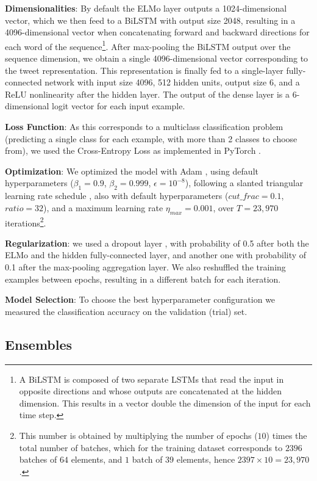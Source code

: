 \documentclass[11pt,a4paper]{article}
\begin{document}
\textbf{Dimensionalities}: By default the ELMo layer outputs a 1024-dimensional
vector, which we then feed to a BiLSTM with output size 2048, resulting in a
4096-dimensional vector when concatenating forward and backward directions for
each word of the sequence\footnote{A BiLSTM is composed of two separate LSTMs
that read the input in opposite directions and whose outputs are concatenated at
the hidden dimension. This results in a vector double the dimension of the input
for each time step.}. After max-pooling the BiLSTM output over the sequence
dimension, we obtain a single 4096-dimensional vector corresponding to the tweet
representation. This representation is finally fed to a single-layer
fully-connected network with input size 4096, 512 hidden units, output size 6,
and a ReLU nonlinearity after the hidden layer. The output of the dense layer is
a 6-dimensional logit vector for each input example.

\textbf{Loss Function}: As this corresponds to a multiclass classification
problem (predicting a single class for each example, with more than 2 classes to
choose from), we used the Cross-Entropy Loss as implemented in PyTorch
\cite{paszke2017automatic}.

\textbf{Optimization}: We optimized the model with Adam
\cite{DBLP:journals/corr/KingmaB14}, using default hyperparameters
($\beta_1=0.9$, $\beta_2=0.999$, $\epsilon=10^{-8}$), following a slanted
triangular learning rate schedule \cite{howard2018universal}, also with default
hyperparameters ($cut\_frac=0.1$, $ratio=32$), and a maximum learning rate
$\eta_{max}=0.001$, over $T=23,970$ iterations\footnote{This number is obtained
    by multiplying the number of epochs ($10$) times the total number of
    batches, which for the training dataset corresponds to $2396$ batches of
$64$ elements, and $1$ batch of $39$ elements, hence $2397\times10=23,970$.}.

\textbf{Regularization}: we used a dropout layer \cite{srivastava2014dropout},
with probability of 0.5 after both the ELMo and the hidden fully-connected
layer, and another one with probability of 0.1 after the max-pooling aggregation
layer. We also reshuffled the training examples between epochs, resulting in a
different batch for each iteration. 

\textbf{Model Selection}: To choose the best hyperparameter configuration we
measured the classification accuracy on the validation (trial) set. 


\subsection{Ensembles}
 
\end{document}
